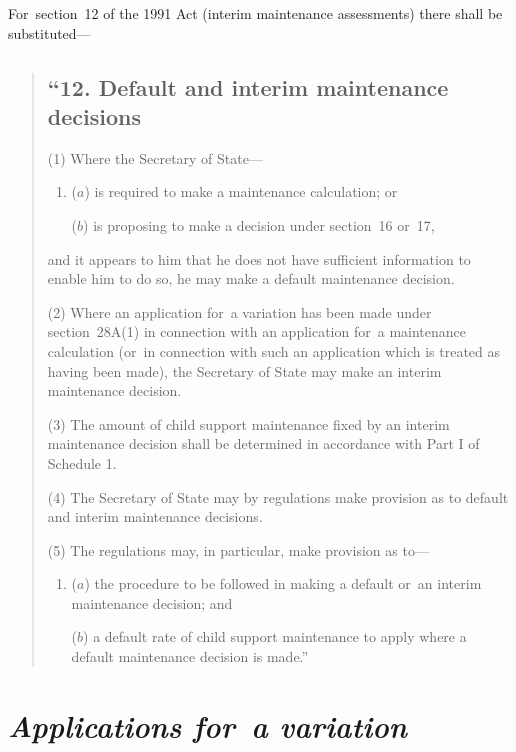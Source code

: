\documentclass[12pt,a4paper]{article}
\begin{document}
For~section~12 of the 1991 Act (interim maintenance assessments) there shall be substituted—
\begin{quotation}
\subsection*{“12. Default and interim maintenance decisions}

(1) Where the Secretary of State—
\begin{enumerate}\item[]
($a$) is required to make a maintenance calculation; or

($b$) is proposing to make a decision under section~16 or~17,
\end{enumerate}
and it appears to him that he does not have sufficient information to enable him to do so, he may make a default maintenance decision.

(2) Where an application for~a variation has been made under section~28A(1)  in connection with an application for~a maintenance calculation (or~in connection with such an application which is treated as having been made), the Secretary of State may make an interim maintenance decision.

(3) The amount of child support maintenance fixed by an interim maintenance decision shall be determined in accordance with Part I of Schedule 1. 

(4) The Secretary of State may by regulations make provision as to default and interim maintenance decisions.

(5) The regulations may, in particular, make provision as to—
\begin{enumerate}\item[]
($a$) the procedure to be followed in making a default or~an interim maintenance decision; and

($b$) a default rate of child support maintenance to apply where a default maintenance decision is made.”
\end{enumerate}
\end{quotation}


\section{\itshape Applications for~a variation}
\end{document}
